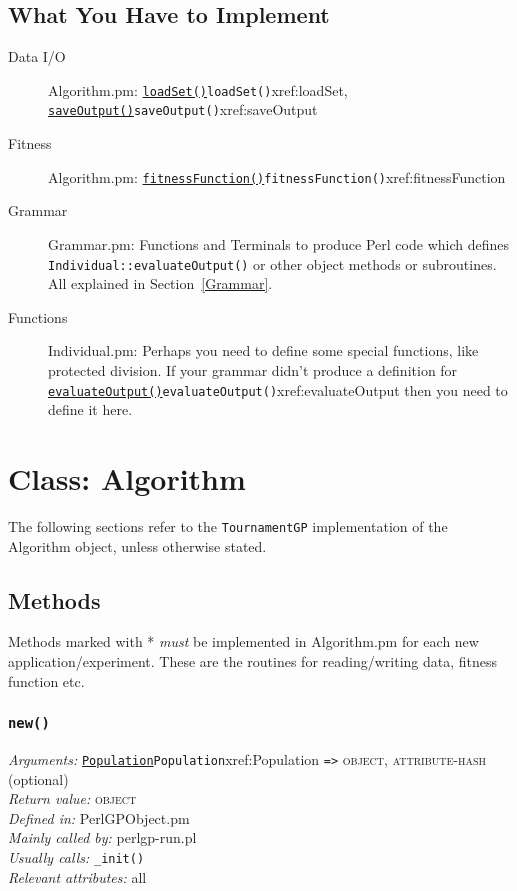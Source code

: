 \documentclass[a4paper]{article}
\begin{document}
\subsection{What You Have to Implement}\label{uimplement}


\begin{description}
\item[Data I/O] Algorithm.pm: \hyperref[no]{\texttt{loadSet()}}{\texttt{loadSet()}}{xref:loadSet}, \hyperref[no]{\texttt{saveOutput()}}{\texttt{saveOutput()}}{xref:saveOutput}
\item[Fitness] Algorithm.pm: \hyperref[no]{\texttt{fitnessFunction()}}{\texttt{fitnessFunction()}}{xref:fitnessFunction}
\item[Grammar] Grammar.pm: Functions and Terminals to produce Perl code which defines
\texttt{Individual::evaluateOutput()} or other object methods or subroutines.  All explained in Section~\ref{Grammar}.
\item[Functions] Individual.pm: Perhaps you need to define some
special functions, like protected division.  If your grammar didn't
produce a definition for \hyperref[no]{\texttt{evaluateOutput()}}{\texttt{evaluateOutput()}}{xref:evaluateOutput} then you need to define it here.
\end{description}


\section{Class: Algorithm}\label{Algorithm}

The following sections refer to the \texttt{TournamentGP}
implementation of the Algorithm object, unless otherwise stated.

\subsection{Methods}

Methods marked with * \emph{must} be implemented in Algorithm.pm for
each new application/experiment.  These are the routines for
reading/writing data, fitness function etc.

\subsubsection{\texttt{new()}}\label{Algorithm::new}
\textit{Arguments:} \hyperref[no]{\texttt{Population}}{\texttt{Population}}{xref:Population} \verb:=>: \textsc{object}, \textsc{attribute-hash} (optional) \\
\textit{Return value:} \textsc{object}\\
\textit{Defined in:} PerlGPObject.pm\\
\textit{Mainly called by:} perlgp-run.pl\\
\textit{Usually calls:} \texttt{\_init()}\\
\textit{Relevant attributes:} all\\
\end{document}
